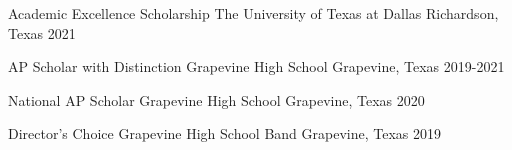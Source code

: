 
\begin{cvhonors}

    \cvhonor
	{Academic Excellence Scholarship}
	{The University of Texas at Dallas}
	{Richardson, Texas}
	{2021}

    \cvhonor
        {AP Scholar with Distinction} %
        {Grapevine High School} %
        {Grapevine, Texas} %
        {2019-2021} %

    \cvhonor
        {National AP Scholar}
        {Grapevine High School}
        {Grapevine, Texas}
        {2020}

    \cvhonor 
	{Director's Choice} 
	{Grapevine High School Band} 
	{Grapevine, Texas} 
	{2019}


\end{cvhonors}
